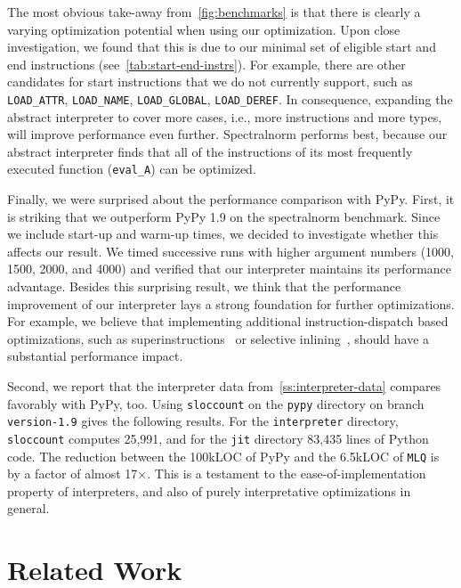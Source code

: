 \documentclass[preprint,10pt]{popl14conf}
\newcommand{\mlq}{\texttt{MLQ}}
\begin{document}
The most obvious take-away from~\autoref{fig:benchmarks} is that there is clearly a varying
optimization potential when using our optimization.
Upon close investigation, we found that this is due to our minimal set of eligible start and
end instructions (see~\autoref{tab:start-end-instrs}).
For example, there are other candidates for start instructions that we do not currently support,
such as \texttt{LOAD_ATTR}, \texttt{LOAD_NAME}, \texttt{LOAD_GLOBAL}, \texttt{LOAD_DEREF}.
In consequence, expanding the abstract interpreter to cover more cases, i.e., more instructions and
more types, will improve performance even further.
\textsf{Spectralnorm} performs best, because our abstract interpreter finds that all of the
instructions of its most frequently executed function (\texttt{eval_A}) can be optimized.

Finally, we were surprised about the performance comparison with PyPy.
First, it is striking that we outperform PyPy 1.9 on the \textsf{spectralnorm} benchmark.
Since we include start-up and warm-up times, we decided to investigate whether this affects our
result.
We timed successive runs with higher argument numbers (1000, 1500, 2000, and 4000) and verified that
our interpreter maintains its performance advantage.
Besides this surprising result, we think that the performance improvement of our interpreter lays a
strong foundation for further optimizations.
For example, we believe that implementing additional instruction-dispatch based optimizations, such
as superinstructions~\cite{proebsting+95,ertl.gregg+03} or selective
inlining~\cite{piumarta.riccardi+98}, should have a substantial performance impact.

Second, we report that the interpreter data from~\autoref{ss:interpreter-data} compares favorably with
PyPy, too.
Using \texttt{sloccount} on the \texttt{pypy} directory on branch \texttt{version-1.9} gives the
following results.
For the \texttt{interpreter} directory, \texttt{sloccount} computes 25,991, and for the \texttt{jit}
directory 83,435 lines of Python code.
The reduction between the 100kLOC of PyPy and the 6.5kLOC of \mlq{} is by a factor of almost
17$\times$.
This is a testament to the ease-of-implementation property of interpreters, and also of purely
interpretative optimizations in general.




\section{Related Work}\label{s:related-work}
\end{document}
